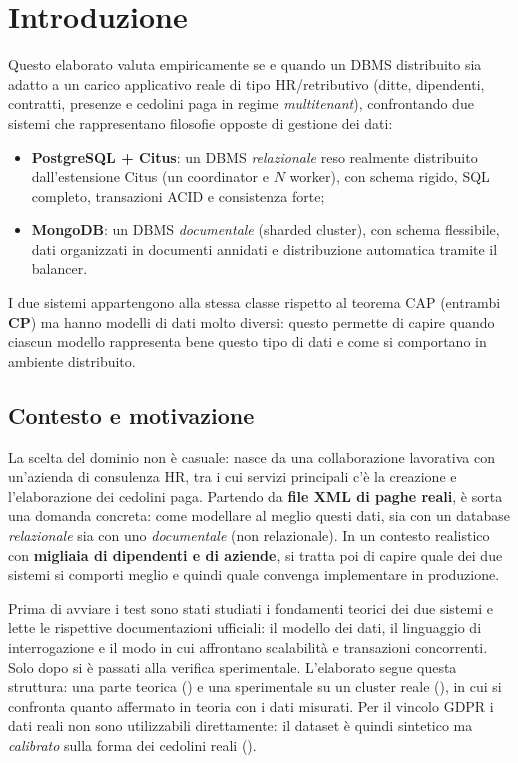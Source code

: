 \chapter{Introduzione}
\label{ch:introduzione}

Questo elaborato valuta empiricamente se e quando un DBMS distribuito sia adatto a un carico applicativo reale di tipo HR/retributivo (ditte, dipendenti, contratti, presenze e cedolini paga in regime
\emph{multitenant}), confrontando due sistemi che rappresentano filosofie opposte di gestione dei dati:

\begin{itemize}
  \item \textbf{PostgreSQL + Citus}: un DBMS \emph{relazionale} reso realmente distribuito dall'estensione
        Citus (un coordinator e $N$ worker), con schema rigido, SQL completo, transazioni ACID e consistenza
        forte;
  \item \textbf{MongoDB}: un DBMS \emph{documentale} (sharded cluster), con schema flessibile, dati
        organizzati in documenti annidati e distribuzione automatica tramite il balancer.
\end{itemize}

I due sistemi appartengono alla stessa classe rispetto al teorema CAP (entrambi \textbf{CP}) ma hanno modelli di dati molto diversi: questo permette di capire quando ciascun modello rappresenta bene questo tipo di dati e come si comportano in ambiente distribuito.

\section{Contesto e motivazione}
\label{sec:usecase}

La scelta del dominio non è casuale: nasce da una collaborazione lavorativa con un'azienda di consulenza HR,
tra i cui servizi principali c'è la creazione e l'elaborazione dei cedolini paga. Partendo da \textbf{file XML
di paghe reali}, è sorta una domanda concreta: come modellare al meglio questi dati, sia con un database
\emph{relazionale} sia con uno \emph{documentale} (non relazionale). In un contesto realistico con
\textbf{migliaia di dipendenti e di aziende}, si tratta poi di capire quale dei due sistemi si comporti meglio
e quindi quale convenga implementare in produzione.

Prima di avviare i test sono stati studiati i fondamenti teorici dei due sistemi e lette le rispettive
documentazioni ufficiali: il modello dei dati, il linguaggio di interrogazione e il modo in cui affrontano
scalabilità e transazioni concorrenti. Solo dopo si è passati alla verifica sperimentale. L'elaborato segue
questa struttura: una parte teorica () e una sperimentale su un cluster reale
(), in cui si confronta quanto affermato in teoria con i dati misurati. Per il vincolo GDPR i dati reali non sono utilizzabili direttamente: il dataset è
quindi sintetico ma \emph{calibrato} sulla forma dei cedolini reali ().

